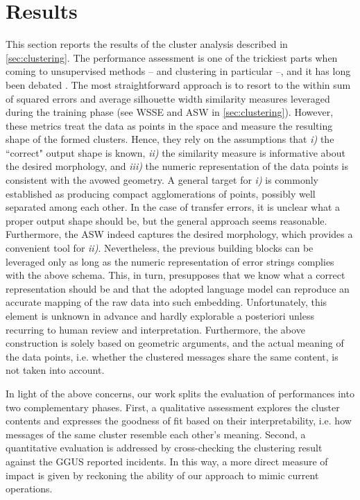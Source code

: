 \chapter{Results} 
\label{ch:opint_results}

This section reports the results of the cluster analysis described in \cref{sec:clustering}. 
The performance assessment is one of the trickiest parts when coming to unsupervised methods -- and clustering in particular --, and it has long been debated \cite{von2012clustering, guyon2009clustering}.
The most straightforward approach is to resort to the within sum of squared errors and average silhouette width similarity measures leveraged during the training phase (see WSSE and ASW in \cref{sec:clustering}).
However, these metrics treat the data as points in the space and measure the resulting shape of the formed clusters. 
Hence, they rely on the assumptions that \textit{i)} the ``correct" output shape is known, \textit{ii)} the similarity measure is informative about the desired morphology, and \textit{iii)} the numeric representation of the data points is consistent with the avowed geometry.
A general target for \textit{i)} is commonly established as producing compact agglomerations of points, possibly well separated among each other. 
In the case of transfer errors, it is unclear what a proper output shape should be, but the general approach seems reasonable. Furthermore, the ASW indeed captures the desired morphology, which provides a convenient tool for \textit{ii)}.
Nevertheless, the previous building blocks can be leveraged only as long as the numeric representation of error strings complies with the above schema. 
This, in turn, presupposes that we know what a correct representation should be and that the adopted language model can reproduce an accurate mapping of the raw data into such embedding.
Unfortunately, this element is unknown in advance and hardly explorable a posteriori unless recurring to human review and interpretation.
Furthermore, the above construction is solely based on geometric arguments, and the actual meaning of the data points, i.e. whether the clustered messages share the same content, is not taken into account.

In light of the above concerns, our work splits the evaluation of performances into two complementary phases.
First, a qualitative assessment explores the cluster contents and expresses the goodness of fit based on their interpretability, i.e. how messages of the same cluster resemble each other's meaning.
Second, a quantitative evaluation is addressed by cross-checking the clustering result against the GGUS reported incidents. In this way, a more direct measure of impact is given by reckoning the ability of our approach to mimic current operations.

